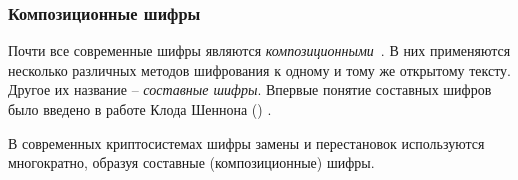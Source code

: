 \subsubsection{Композиционные шифры}

Почти все современные шифры являются \emph{композиционными}~\cite{AlZKCh:2001}. В них применяются несколько различных методов шифрования к одному и тому же открытому тексту. Другое их название -- \emph{составные шифры}. Впервые понятие составных шифров было введено в работе Клода Шеннона () \cite{Shannon:1949:CTS}.

В современных криптосистемах шифры замены и перестановок используются многократно, образуя составные (композиционные) шифры.

